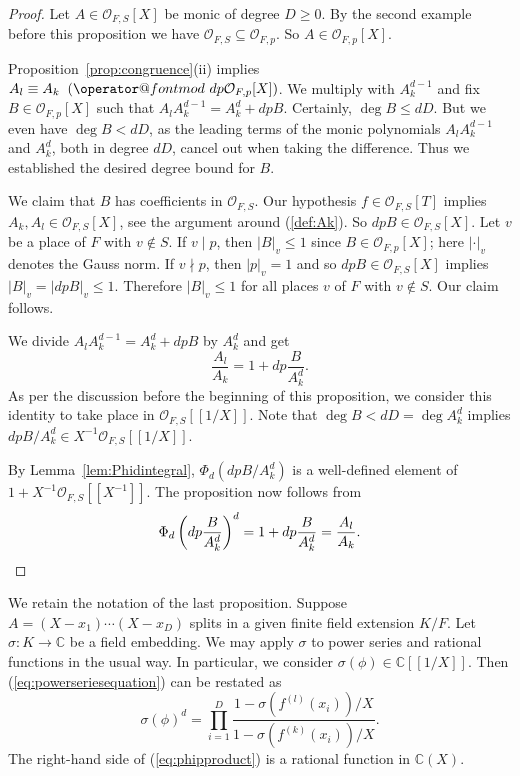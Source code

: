 \documentclass[12pt,oneside,a4]{amsart}
\makeatletter
\newcommand{\IC}{\mathbb{C}}
\newcommand{\cO}{\mathcal{O}}
\numberwithin{maincounter}{section}
\numberwithin{equation}{section}
\renewcommand{\subset}{\subseteq}
\def\imod#1{\allowbreak\mkern10mu({\operator@font mod}\,\,#1)}
\makeatother
\begin{document}
\begin{proof}
  Let $A\in\cO_{F,S}[X]$ be monic of degree $D\ge 0$.
  By
  the second example before this proposition we have
   $\cO_{F,S}\subset \cO_{F,p}$. So $A\in \cO_{F,p}[X]$. 
 
  Proposition~\ref{prop:congruence}(ii)
  implies $A_l\equiv A_k \imod{dp\cO_{F,p}[X]}$. We multiply with
  $A_k^{d-1}$ and fix $B\in \cO_{F,p}[X]$ such that
  $A_l A_k^{d-1} = A_k^d + dp B$. 
  Certainly, $\deg B\le dD$. But we even have
  $\deg B <dD$, as the leading terms of the monic polynomials
  $A_lA_k^{d-1}$ and $A_k^d$,
  both in degree $dD$, cancel out when taking  the difference.
  Thus we established the desired degree bound for $B$.

  
  
  We claim that $B$ has coefficients in $\cO_{F,S}$.
  Our hypothesis $f\in\cO_{F,S}[T]$ implies 
  $A_k,A_l\in \cO_{F,S}[X]$, see the argument around (\ref{def:Ak}). 
  So $dpB\in \cO_{F,S}[X]$. Let $v$ be a  place  of $F$ with
  $v\not\in S$. If $v\mid p$, then $|B|_v\le 1$ since $B\in
  \cO_{F,p}[X]$; here $|\cdot|_v$ denotes the Gauss norm.
  If $v\nmid p$, then $|p|_v=1$ and so $dp B\in\cO_{F,S}[X]$ implies
  $|B|_v = |dp B|_v \le 1$. Therefore $|B|_v\le 1$ for all places $v$
  of $F$ with $v\not\in S$. Our claim follows. 
  
  We divide $A_l A_k^{d-1} = A_k^d + dp B$ by $A_k^d$ and get
  \begin{equation*}
    \frac{A_l}{A_k} = 1 + dp \frac{B}{A_k^d}.
  \end{equation*}
  As per the discussion before the  beginning of this proposition,
  we consider this identity to
  take place in 
  $\cO_{F,S}[[1/X]]$.
  Note that $\deg B < dD = \deg{A_k^d}$ implies $dpB/A_k^d \in X^{-1}
  \cO_{F,S}[[1/X]]$.  

  By Lemma~\ref{lem:Phidintegral},   $\Phi_d(dpB/A_k^d)$ is a
  well-defined element of 
  $1+X^{-1}\cO_{F,S}[[X^{-1}]]$.  The proposition now follows from
  \begin{equation*}
    \Phi_d\left(dp\frac{B}{A_k^d}\right)^d =
    1+dp\frac{B}{A_k^d}=\frac{A_l}{A_k}.\qedhere
  \end{equation*}
\end{proof}  

We retain the notation of the last proposition. Suppose $A =
(X-x_1)\cdots(X-x_D)$ splits in a given finite field extension $K/F$. Let
$\sigma \colon K\rightarrow\IC$ be a field embedding.
We may apply $\sigma$ to power series and rational functions in the
usual way. In particular, 
we consider $\sigma(\phi) \in \IC[[1/X]]$. 
Then (\ref{eq:powerseriesequation}) can be restated as
\begin{equation}
  \label{eq:phipproduct}
  \sigma(\phi)^d = \prod_{i=1}^D \frac{  1-\sigma(f^{(l)}(x_i))/X}{1-\sigma(f^{(k)}(x_i))/X}.
\end{equation}
The right-hand side of (\ref{eq:phipproduct}) is a
rational function in $\IC(X)$.
\end{document}
